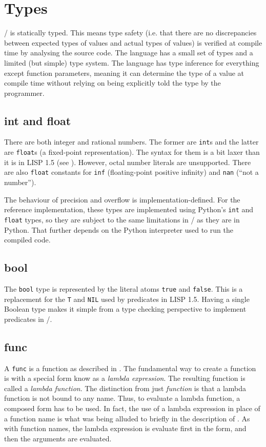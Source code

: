 \documentclass[a4paper, 12pt]{article}
\begin{document}
\section{Types}
\lispy/ is statically typed. This means type safety (i.e. that there are no discrepancies between expected types of values and actual types of values) is verified at compile time by analysing the source code. The language has  a small set of types and a limited (but simple) type system. The language has type inference for everything except function parameters, meaning it can determine the type of a value at compile time without relying on being explicitly told the type by the programmer.

\subsection{int and float}
There are both integer and rational numbers. The former are \texttt{int}s and the latter are \texttt{float}s (a fixed-point representation). The syntax for them is a bit laxer than it is in LISP 1.5 (see ). However, octal number literals are unsupported. There are also \texttt{float} constants for \texttt{inf} (floating-point positive infinity) and \texttt{nan} (``not a number'').

The behaviour of precision and overflow is implementation-defined. For the reference implementation, these types are implemented using Python's \texttt{int} and \texttt{float} types, so they are subject to the same limitations in \lispy/ as they are in Python. That further depends on the Python interpreter used to run the compiled code.

\subsection{bool}
The \texttt{bool} type is represented by the literal atoms \texttt{true} and \texttt{false}. This is a replacement for the \texttt{T} and \texttt{NIL} used by predicates in LISP 1.5. Having a single Boolean type makes it simple from a type checking perspective to implement predicates in \lispy/.

\subsection{func} \label{func}
A \texttt{func} is a function as described in . The fundamental way to create a function is with a special form know as a \textit{lambda expression}. The resulting function is called a \textit{lambda function}. The distinction from just \textit{function} is that a lambda function is not bound to any name. Thus, to evaluate a lambda function, a composed form has to be used. In fact, the use of a lambda expression in place of a function name is what was being alluded to briefly in the description of . As with function names, the lambda expression is evaluate first in the form, and then the arguments are evaluated.
\end{document}
